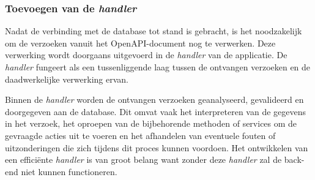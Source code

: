 \subsubsection{Toevoegen van de \textit{handler}}
Nadat de verbinding met de database tot stand is gebracht, is het noodzakelijk om de verzoeken vanuit het OpenAPI-document nog te verwerken. Deze verwerking wordt doorgaans uitgevoerd in de \textit{handler} van de applicatie. De \textit{handler} fungeert als een tussenliggende laag tussen de ontvangen verzoeken en de daadwerkelijke verwerking ervan.

Binnen de \textit{handler} worden de ontvangen verzoeken geanalyseerd, gevalideerd en doorgegeven aan de database. Dit omvat vaak het interpreteren van de gegevens in het verzoek, het oproepen van de bijbehorende methoden of services om de gevraagde acties uit te voeren en het afhandelen van eventuele fouten of uitzonderingen die zich tijdens dit proces kunnen voordoen. Het ontwikkelen van een efficiënte \textit{handler} is van groot belang want zonder deze \textit{handler} zal de back-end niet kunnen functioneren.

